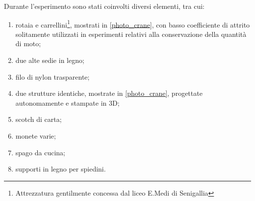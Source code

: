 \documentclass[11pt, a4paper, twoside, italian]{article}
\begin{document}
Durante l'esperimento sono stati coinvolti diversi elementi, tra cui:
\begin{enumerate}
      \item rotaia e carrellini\footnote{Attrezzatura gentilmente concessa dal liceo E.Medi di Senigallia}, mostrati in \cref{photo_crane}, con basso coefficiente di attrito solitamente
      utilizzati in esperimenti relativi alla conservazione della quantità
      di moto;
      \item due alte sedie in legno;
      \item filo di nylon trasparente;
      \item due strutture identiche, mostrate in \cref{photo_crane}, progettate autonomamente e stampate in 3D;
      \item scotch di carta;
      \item monete varie;
      \item spago da cucina;
      \item supporti in legno per spiedini.
\end{enumerate}
\end{document}
